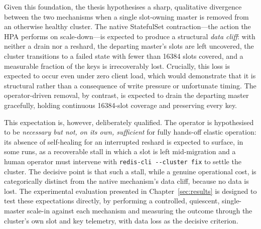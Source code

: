 Given this foundation, the thesis hypothesises a sharp, qualitative divergence between the
two mechanisms when a single slot-owning master is removed from an otherwise healthy
cluster. The native StatefulSet contraction---the action the HPA performs on
scale-down---is expected to produce a structural \textit{data cliff}: with neither a drain
nor a reshard, the departing master's slots are left uncovered, the cluster transitions to a
failed state with fewer than \num{16384} slots covered, and a measurable fraction of the
keys is irrecoverably lost. Crucially, this loss is expected to occur even under zero client
load, which would demonstrate that it is structural rather than a consequence of write
pressure or unfortunate timing. The operator-driven removal, by contrast, is expected to
drain the departing master gracefully, holding continuous \num{16384}-slot coverage and
preserving every key.

This expectation is, however, deliberately qualified. The operator is hypothesised to be
\textit{necessary but not, on its own, sufficient} for fully hands-off elastic operation: its
absence of self-healing for an interrupted reshard is expected to surface, in some runs, as a
recoverable stall in which a slot is left mid-migration and a human operator must intervene
with \texttt{redis-cli -{}-cluster fix} to settle the cluster. The decisive point is that such
a stall, while a genuine operational cost, is categorically distinct from the native
mechanism's data cliff, because no data is lost. The experimental evaluation presented in
Chapter~\ref{sec:results} is designed to test these expectations directly, by performing a
controlled, quiescent, single-master scale-in against each mechanism and measuring the
outcome through the cluster's own slot and key telemetry, with data loss as the decisive
criterion.

